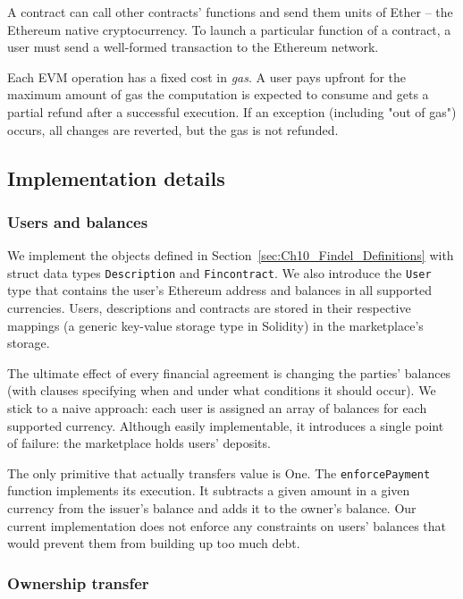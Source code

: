 A contract can call other contracts' functions and send them units of Ether -- the Ethereum native cryptocurrency.
To launch a particular function of a contract, a user must send a well-formed transaction to the Ethereum network.

Each EVM operation has a fixed cost in \textit{gas}.
A user pays upfront for the maximum amount of gas the computation is expected to consume and gets a partial refund after a successful execution.
If an exception (including "out of gas") occurs, all changes are reverted, but the gas is not refunded.


\subsection{Implementation details}

\subsubsection{Users and balances}

We implement the objects defined in Section~\ref{sec:Ch10_Findel_Definitions} with struct data types \texttt{Description} and \texttt{Fincontract}.
We also introduce the \texttt{User} type that contains the user's Ethereum address and balances in all supported currencies.
Users, descriptions and contracts are stored in their respective mappings (a generic key-value storage type in Solidity) in the marketplace's storage.

The ultimate effect of every financial agreement is changing the parties' balances (with clauses specifying when and under what conditions it should occur).
We stick to a naive approach: each user is assigned an array of balances for each supported currency.
Although easily implementable, it introduces a single point of failure: the marketplace holds users' deposits.

The only primitive that actually transfers value is \(\mathrm{One}\).
The \texttt{enforcePayment} function implements its execution.
It subtracts a given amount in a given currency from the issuer's balance and adds it to the owner's balance.
Our current implementation does not enforce any constraints on users' balances that would prevent them from building up too much debt.


\subsubsection{Ownership transfer}

